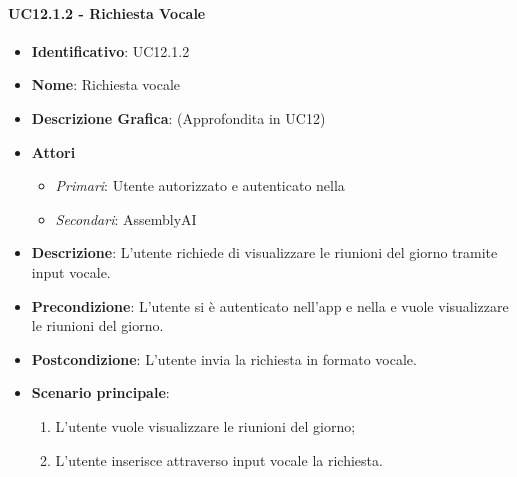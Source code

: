 \paragraph{UC12.1.2 - Richiesta Vocale }
\begin{itemize}
	\item \textbf{Identificativo}: UC12.1.2
	\item \textbf{Nome}: Richiesta vocale
	\item\textbf{Descrizione Grafica}: (Approfondita in UC12)
	\item \textbf{Attori}
	\begin{itemize} 
		\item \textit{Primari}: Utente autorizzato e autenticato nella 
		\item \textit{Secondari}: AssemblyAI
	\end{itemize}
	\item \textbf{Descrizione}: L'utente richiede di visualizzare le riunioni del giorno tramite input vocale.
	\item \textbf{Precondizione}: L'utente si è autenticato nell'app e nella  e vuole visualizzare le riunioni del giorno.
	\item \textbf{Postcondizione}: L'utente invia la richiesta in formato vocale.
	\item \textbf{Scenario principale}:
	\begin{enumerate}
		\item L'utente vuole visualizzare le riunioni del giorno;
		\item L'utente inserisce attraverso input vocale la richiesta.
	\end{enumerate}
\end{itemize}

